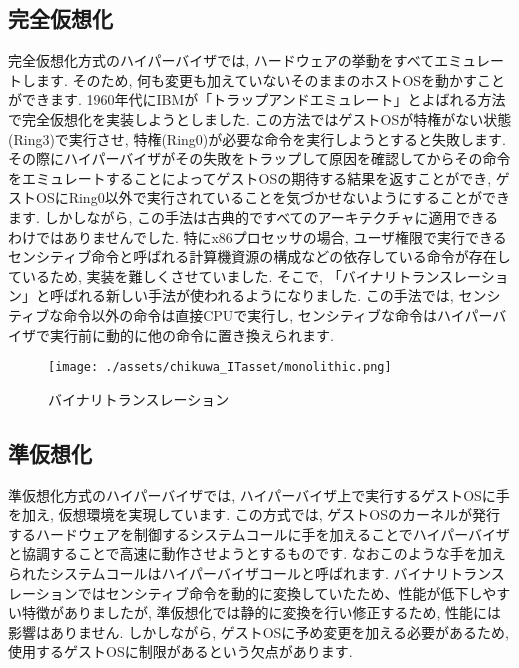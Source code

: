 \subsection{完全仮想化}
完全仮想化方式のハイパーバイザでは, ハードウェアの挙動をすべてエミュレートします. そのため, 何も変更も加えていないそのままのホストOSを動かすことができます. 1960年代にIBMが「トラップアンドエミュレート」とよばれる方法で完全仮想化を実装しようとしました. この方法ではゲストOSが特権がない状態(Ring3)で実行させ, 特権(Ring0)が必要な命令を実行しようとすると失敗します. その際にハイパーバイザがその失敗をトラップして原因を確認してからその命令をエミュレートすることによってゲストOSの期待する結果を返すことができ, ゲストOSにRing0以外で実行されていることを気づかせないようにすることができます. しかしながら, この手法は古典的ですべてのアーキテクチャに適用できるわけではありませんでした. 特にx86プロセッサの場合, ユーザ権限で実行できるセンシティブ命令と呼ばれる計算機資源の構成などの依存している命令が存在しているため, 実装を難しくさせていました. そこで, 「バイナリトランスレーション」と呼ばれる新しい手法が使われるようになりました. この手法では, センシティブな命令以外の命令は直接CPUで実行し, センシティブな命令はハイパーバイザで実行前に動的に他の命令に置き換えられます.
\begin{figure}[htbp]
    \centering
    \texttt{[image: ./assets/chikuwa\_ITasset/monolithic.png]}
    \caption{バイナリトランスレーション}
    \label{fig:binarytranslation}
\end{figure}
\subsection{準仮想化}
準仮想化方式のハイパーバイザでは, ハイパーバイザ上で実行するゲストOSに手を加え, 仮想環境を実現しています. この方式では, ゲストOSのカーネルが発行するハードウェアを制御するシステムコールに手を加えることでハイパーバイザと協調することで高速に動作させようとするものです. なおこのような手を加えられたシステムコールはハイパーバイザコールと呼ばれます. バイナリトランスレーションではセンシティブ命令を動的に変換していたため、性能が低下しやすい特徴がありましたが, 準仮想化では静的に変換を行い修正するため, 性能には影響はありません. しかしながら, ゲストOSに予め変更を加える必要があるため, 使用するゲストOSに制限があるという欠点があります.
